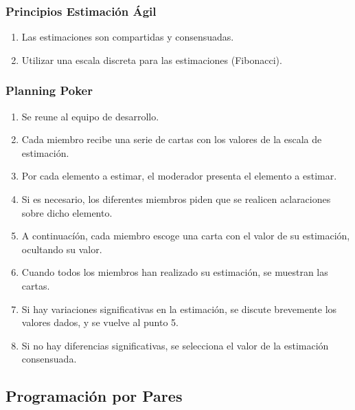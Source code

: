 \documentclass[animated,a4paper,slidestop,xcolor=pst,blue]{beamer}
\begin{document}
\begin{frame}[c]
    \frametitle{Principios Estimación Ágil}
    \begin{enumerate}[<+->]
        \item Las estimaciones son compartidas y consensuadas.
        \item Utilizar una escala discreta para las estimaciones (Fibonacci).
    \end{enumerate}
\end{frame}

\begin{frame}[c]
    \frametitle{Planning Poker}
    \begin{enumerate}[<+->]
        \item Se reune al equipo de desarrollo.
        \item Cada miembro recibe una serie de cartas con los valores de la escala de estimación.
        \item Por cada elemento a estimar, el moderador presenta el elemento a estimar.
        \item Si es necesario, los diferentes miembros piden que se realicen aclaraciones sobre dicho elemento.
        \item A continuacíón, cada miembro escoge una carta con el valor de su estimación, ocultando su valor.
        \item Cuando todos los miembros han realizado su estimación, se muestran las cartas.
        \item Si hay variaciones significativas en la estimación, se discute brevemente los valores dados, y se vuelve al punto 5.
        \item Si no hay diferencias significativas, se selecciona el valor de la estimación consensuada.
    \end{enumerate}
\end{frame}

\subsection{Programación por Pares}
\end{document}
